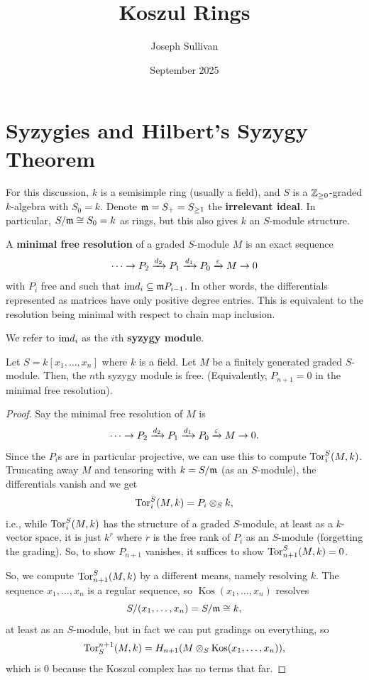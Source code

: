 \documentclass[12pt]{article}
\title{Koszul Rings}
\author{Joseph Sullivan}
\date{September 2025}
\DeclareMathOperator{\Kos}{Kos}
\begin{document}
\maketitle
\tableofcontents

\section{Syzygies and Hilbert's Syzygy Theorem}

For this discussion, $k$ is a semisimple ring (usually a field), and $S$ is a $\mathbb{Z}_{\geq 0}$-graded $k$-algebra with $S_0 = k$. Denote $\mathfrak{m} = S_+ = S_{\geq 1}$ the \textbf{irrelevant ideal}. In particular, $S/\mathfrak{m} \cong S_0 = k$ as rings, but this also gives $k$ an $S$-module structure.

\begin{defn}
    A \textbf{minimal free resolution} of a graded $S$-module $M$ is an exact sequence
    \[\cdots \to P_2 \xrightarrow{d_2} P_1 \xrightarrow{d_1} P_0 \xrightarrow{\varepsilon} M \to 0\]
    with $P_i$ free and such that $\mathrm{im} d_i \subseteq \mathfrak{m} P_{i-1}$. In other words, the differentials represented as matrices have only positive degree entries. This is equivalent to the resolution being minimal with respect to chain map inclusion.

    We refer to $\mathrm{im} d_i$ as the $i$th \textbf{syzygy module}.
\end{defn}


\begin{thm}
    Let $S=k[x_1,\dots,x_n]$ where $k$ is a field. Let $M$ be a finitely generated graded $S$-module. Then, the $n$th syzygy module is free. (Equivalently, $P_{n+1}=0$ in the minimal free resolution).
\end{thm}
\begin{proof}
    Say the minimal free resolution of $M$ is
    \[\cdots \to P_2 \xrightarrow{d_2} P_1 \xrightarrow{d_1} P_0 \xrightarrow{\varepsilon} M \to 0.\]
    Since the $P_i$s are in particular projective, we can use this to compute $\mathrm{Tor}^S_i(M,k)$. Truncating away $M$ and tensoring with $k=S/\mathfrak{m}$ (as an $S$-module), the differentials vanish and we get
    \[\mathrm{Tor}^S_i(M,k) = P_i \otimes_S k,\]
    i.e., while $\mathrm{Tor}^S_i(M,k)$ has the structure of a graded $S$-module, at least as a $k$-vector space, it is just $k^r$ where $r$ is the free rank of $P_i$ as an $S$-module (forgetting the grading). So, to show $P_{n+1}$ vanishes, it suffices to show $\mathrm{Tor}^S_{n+1}(M,k)=0$.

    So, we compute $\mathrm{Tor}^S_{n+1}(M,k)$ by a different means, namely resolving $k$. The sequence $x_1,\dots,x_n$ is a regular sequence, so $\Kos(x_1,\dots,x_n)$ resolves
    \[S/(x_1,\dots,x_n) = S/\mathfrak{m} \cong k,\]
    at least as an $S$-module, but in fact we can put gradings on everything, so
    \[\Tor^{n+1}_S(M,k) = H_{n+1}(M \otimes_S \Kos(x_1,\dots,x_n)),\]
    which is 0 because the Koszul complex has no terms that far.
\end{proof}
\end{document}
